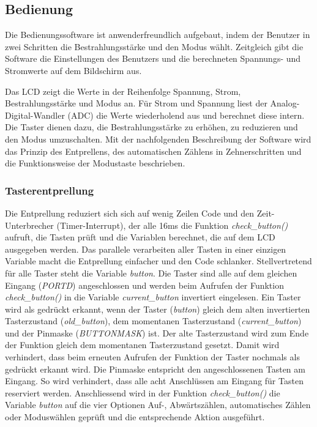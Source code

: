 \subsection{Bedienung}
Die Bedienungssoftware ist anwenderfreundlich aufgebaut, indem der Benutzer in zwei Schritten die Bestrahlungsstärke und den Modus wählt. Zeitgleich gibt die Software die Einstellungen des Benutzers und die berechneten Spannungs- und Stromwerte auf dem Bildschirm aus.

Das LCD zeigt die Werte in der Reihenfolge Spannung, Strom, Bestrahlungsstärke und Modus an. Für Strom und Spannung liest der Analog-Digital-Wandler (ADC) die Werte wiederholend aus und berechnet diese intern. Die Taster dienen dazu, die Bestrahlungsstärke zu erhöhen, zu reduzieren und den Modus umzuschalten. Mit der nachfolgenden Beschreibung der Software wird das Prinzip des Entprellens, des automatischen Zählens in Zehnerschritten und die Funktionsweise der Modustaste beschrieben.

\subsubsection{Tasterentprellung}
Die Entprellung reduziert sich sich auf wenig Zeilen Code und den Zeit-Unterbrecher (Timer-Interrupt), der alle 16ms die Funktion \textit{check\_button()} aufruft, die Tasten prüft und die Variablen berechnet, die auf dem LCD ausgegeben werden. Das parallele verarbeiten aller Tasten in einer einzigen Variable macht die Entprellung einfacher und den Code schlanker. Stellvertretend für alle Taster steht die Variable \textit{button}. Die Taster sind alle auf dem gleichen Eingang (\textit{PORTD}) angeschlossen und werden beim Aufrufen der Funktion \textit{check\_button()} in die Variable \textit{current\_button} invertiert eingelesen. Ein Taster wird als gedrückt erkannt, wenn der Taster (\textit{button}) gleich dem alten invertierten Tasterzustand (\textit{old\_button}), dem momentanen Tasterzustand (\textit{current\_button}) und der Pinmaske (\textit{BUTTONMASK}) ist. Der alte Tasterzustand wird zum Ende der Funktion gleich dem momentanen Tasterzustand gesetzt. Damit wird verhindert, dass beim erneuten Aufrufen der Funktion der Taster nochmals als gedrückt erkannt wird. Die Pinmaske entspricht den angeschlossenen Tasten am Eingang. So wird verhindert, dass alle acht Anschlüssen am Eingang für Tasten reserviert werden.
Anschliessend wird in der Funktion \textit{check\_button()} die Variable \textit{button} auf die vier Optionen Auf-, Abwärtszählen, automatisches Zählen oder Moduswählen geprüft und die entsprechende Aktion ausgeführt.

